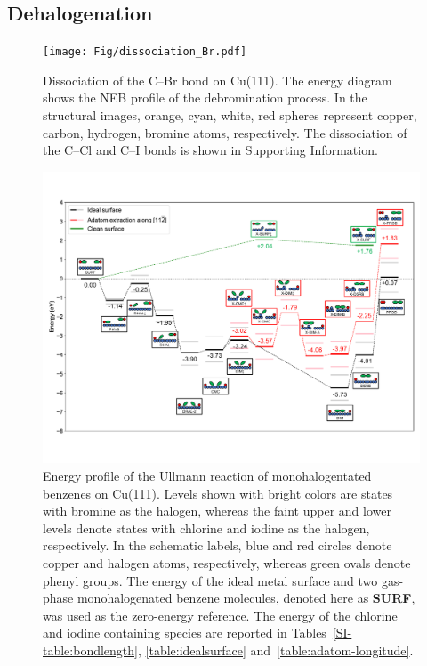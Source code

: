 \documentclass[aps,prb,reprint,amsmath,amssymb]{revtex4-1}
\newcommand{\sinfo}{Supporting Information}
\begin{document}
\ifdefined\INTERNAL
\subsection{Dehalogenation}
\fi

\begin{figure}[hbt]
\centering
\texttt{[image: Fig/dissociation\_Br.pdf]}
\caption{Dissociation of the C--Br bond on Cu(111). The energy diagram shows the NEB profile of the debromination process. In the structural images, orange, cyan, white, red spheres represent copper, carbon, hydrogen, bromine atoms, respectively. The dissociation of the C--Cl and C--I bonds is shown in \sinfo.}
\label{fig:dissociation_Br}
\end{figure}

\begin{figure}[hbt]
\centering
\includegraphics[width=1.\textwidth]{Fig/main-profile.pdf}
\caption{Energy profile of the Ullmann reaction of monohalogentated benzenes on Cu(111). Levels shown with bright colors are states with bromine as the halogen, whereas the faint upper and lower levels denote states with chlorine and iodine as the halogen, respectively. In the schematic labels, blue and red circles denote copper and halogen atoms, respectively, whereas green ovals denote phenyl groups. The energy of the ideal metal surface and two gas-phase monohalogenated benzene molecules, denoted here as \textbf{SURF}, was used as the zero-energy reference. The energy of the chlorine and iodine containing species are reported in Tables~\ref{SI-table:bondlength}, \ref{table:idealsurface} and~\ref{table:adatom-longitude}.
}
\label{fig:completeenergy}
\end{figure}
\end{document}

